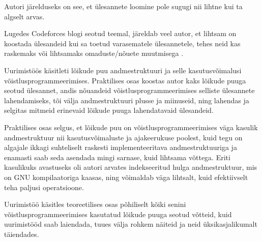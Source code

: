 \documentclass{trkut}
\theoremstyle{definition}
\begin{document}
Autori järelduseks on see, et ülesannete loomine pole sugugi nii lihtne kui ta algselt arvas.

Lugedes Codeforces blogi seotud teemal, järeldab veel autor, et lihtsam on koostada ülesandeid kui sa toetud varasematele ülesannetele, tehes neid kas raskemaks või lihtsamaks omaduste/nõuete muutmisega \parencite{problemsetting}.


Uurimistöös käsitleti lõikude puu andmestruktuuri ja selle kasutusvõimalusi võistlusprogrammeerimises. Praktilises osas koostas autor kaks lõikude puuga seotud ülesannet, andis nõuandeid võistlusprogrammeerimises selliste ülesannete lahendamiseks, tõi välja andmestruktuuri plusse ja miinuseid, ning lahendas ja selgitas mitmeid erinevaid lõikude puuga lahendatavaid ülesandeid.

Praktilises osas selgus, et lõikude puu on võistlusprogrammeerimises väga kasulik andmestruktuur nii kasutusvõimaluste ja ajakeerukuse poolest, kuid tegu on algajale ikkagi suhteliselt raskesti implementeeritava andmestruktuuriga ja enamasti saab seda asendada mingi sarnase, kuid lihtsama võttega. Eriti kasulikuks avastuseks oli autori arvates indekseeritud hulga andmestruktuur, mis on GNU kompilaatoriga kaasas, ning võimaldab väga lihtsalt, kuid efektiivselt teha paljusi operatsioone.

Uurimistöö käsitles teoreetilises osas põhiliselt kõiki senini võistlusprogrammeerimises kasutatud lõikude puuga seotud võtteid, kuid uurimistööd saab laiendada, tuues välja rohkem näiteid ja neid üksikasjalikumalt täiendades.


\printbibliography
\end{document}
